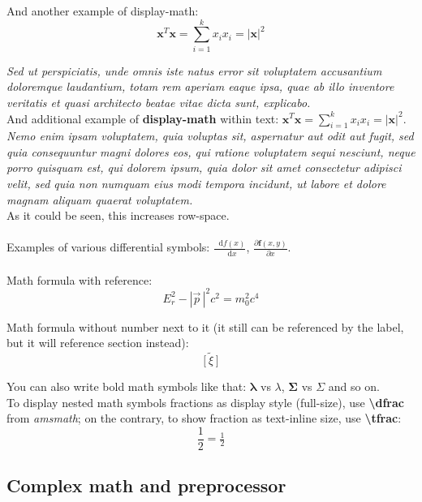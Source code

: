 \documentclass{article}
\newcommand*\diff{\mathop{}\!\mathrm{d}}
\begin{document}
And another example of display-math:
$$
\mathbf{x}^{T}\mathbf{x} = \sum_{i=1}^k x_i x_i = |\mathbf{x}|^{2}
$$

\textit{Sed ut perspiciatis, unde omnis iste natus error sit voluptatem accusantium doloremque laudantium, totam rem aperiam eaque ipsa, quae ab illo inventore veritatis et quasi architecto beatae vitae dicta sunt, explicabo.}\\
And additional example of \textbf{display-math} within text: $\displaystyle\mathbf{x}^{T}\mathbf{x} = \sum_{i=1}^k x_i x_i = |\mathbf{x}|^{2}$.\\
\textit{Nemo enim ipsam voluptatem, quia voluptas sit, aspernatur aut odit aut fugit, sed quia consequuntur magni dolores eos, qui ratione voluptatem sequi nesciunt, neque porro quisquam est, qui dolorem ipsum, quia dolor sit amet consectetur adipisci velit, sed quia non numquam eius modi tempora incidunt, ut labore et dolore magnam aliquam quaerat voluptatem.}\\

As it could be seen, this increases row-space.\\
\\
Examples of various differential symbols: $\frac{\diff f(x)}{\diff x}$, $\frac{\partial \mathbf{f}(x, y)}{\partial x}$.\\
\\

Math formula with reference:
\begin{equation} \label{eq:e_mc2}
E_{r}^{2}-|{\vec {p}}\,|^{2}c^{2}=m_{0}^{2}c^{4}
\end{equation}

Math formula without number next to it (it still can be referenced by the label, but it will reference section instead):
\begin{equation*} \label{eq:accents}
\widetilde{[\xi]}
\end{equation*}

You can also write bold math symbols like that: $\boldsymbol{\lambda}$ vs $\lambda$, $\boldsymbol{\Sigma}$ vs $\Sigma$ and so on.\\

To display nested math symbols fractions as display style (full-size), use \textbf{\textbackslash dfrac} from \textit{amsmath}; on the contrary, to show fraction as text-inline size, use \textbf{\textbackslash tfrac}:
$$
\dfrac{1}{2} = \tfrac{1}{2}
$$



\subsection{Complex math and preprocessor} \label{sec:complex_math}
\end{document}
